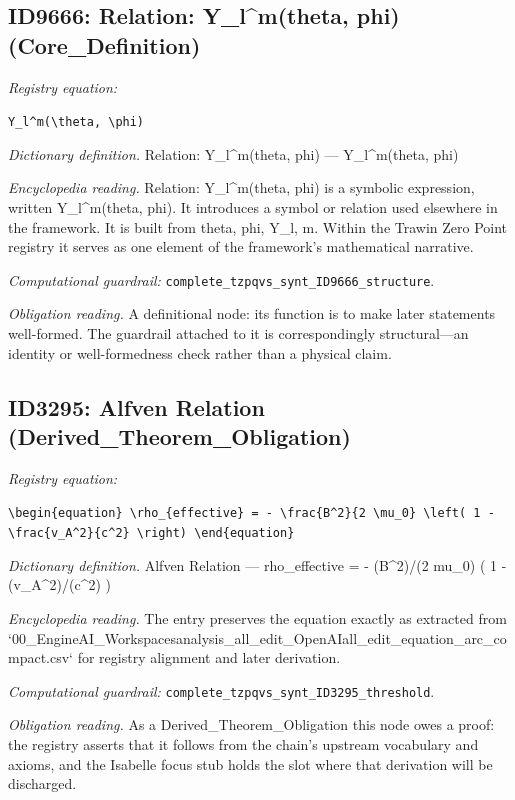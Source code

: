 \documentclass[11pt]{article}
\theoremstyle{remark}
\begin{document}
\subsection{ID9666: Relation: Y\_l\textasciicircum{}m(theta, phi) (Core\_Definition)}

\noindent\textit{Registry equation:}\par
{\small\texttt{Y\_l\textasciicircum{}m(\textbackslash{}theta, \textbackslash{}phi)}}\par\medskip
\noindent\textit{Dictionary definition.} Relation: Y\_l\textasciicircum{}m(theta, phi) --- Y\_l\textasciicircum{}m(theta, phi)\par\medskip
\noindent\textit{Encyclopedia reading.} Relation: Y\_l\textasciicircum{}m(theta, phi) is a symbolic expression, written Y\_l\textasciicircum{}m(theta, phi). It introduces a symbol or relation used elsewhere in the framework. It is built from theta, phi, Y\_l, m. Within the Trawin Zero Point registry it serves as one element of the framework's mathematical narrative.
\par\medskip\noindent\textit{Computational guardrail:} \texttt{complete\_tzpqvs\_synt\_ID9666\_structure}.
\par\medskip\noindent\textit{Obligation reading.} A definitional node: its function is to make later statements well-formed. The guardrail attached to it is correspondingly structural---an identity or well-formedness check rather than a physical claim.

\subsection{ID3295: Alfven Relation (Derived\_Theorem\_Obligation)}

\noindent\textit{Registry equation:}\par
{\small\texttt{\textbackslash{}begin\{equation\} \textbackslash{}rho\_\{effective\} = - \textbackslash{}frac\{B\textasciicircum{}2\}\{2 \textbackslash{}mu\_0\} \textbackslash{}left( 1 - \textbackslash{}frac\{v\_A\textasciicircum{}2\}\{c\textasciicircum{}2\} \textbackslash{}right) \textbackslash{}end\{equation\}}}\par\medskip
\noindent\textit{Dictionary definition.} Alfven Relation --- rho\_effective = - (B\textasciicircum{}2)/(2 mu\_0) ( 1 - (v\_A\textasciicircum{}2)/(c\textasciicircum{}2) )\par\medskip
\noindent\textit{Encyclopedia reading.} The entry preserves the equation exactly as extracted from `00\_EngineAI\_Workspacesanalysis\_all\_edit\_OpenAIall\_edit\_equation\_arc\_compact.csv` for registry alignment and later derivation.
\par\medskip\noindent\textit{Computational guardrail:} \texttt{complete\_tzpqvs\_synt\_ID3295\_threshold}.
\par\medskip\noindent\textit{Obligation reading.} As a Derived\_Theorem\_Obligation this node owes a proof: the registry asserts that it follows from the chain's upstream vocabulary and axioms, and the Isabelle focus stub holds the slot where that derivation will be discharged.
\end{document}
